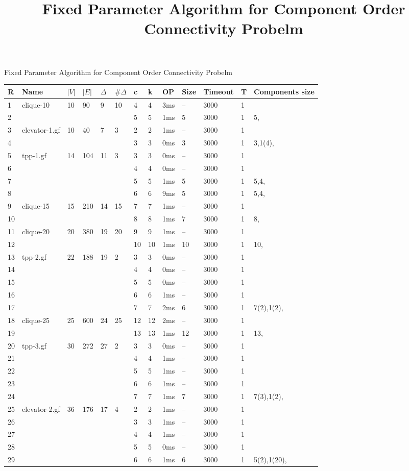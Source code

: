 \documentclass{article}
\title{Fixed Parameter Algorithm for Component Order Connectivity Probelm}
\begin{document}
\maketitle
Fixed Parameter Algorithm for Component Order Connectivity Probelm
\begin{longtable}{|l |l |l |l |l |l |l |l |l |l |l |l |l |}
\hline
R&Name&$|V|$&$|E|$&$\Delta$&$\# \Delta$&c&k&OP&Size&Timeout&T&Components size\\
\hline
1&clique-10&10&90&9&10&4&4&3ms&--&3000&1&\\
2&&&&&&5&5&1ms&5&3000&1&5,\\
3&elevator-1.gf&10&40&7&3&2&2&1ms&--&3000&1&\\
4&&&&&&3&3&0ms&3&3000&1&3,1(4),\\
5&tpp-1.gf&14&104&11&3&3&3&0ms&--&3000&1&\\
6&&&&&&4&4&0ms&--&3000&1&\\
7&&&&&&5&5&1ms&5&3000&1&5,4,\\
8&&&&&&6&6&9ms&5&3000&1&5,4,\\
9&clique-15&15&210&14&15&7&7&1ms&--&3000&1&\\
10&&&&&&8&8&1ms&7&3000&1&8,\\
11&clique-20&20&380&19&20&9&9&1ms&--&3000&1&\\
12&&&&&&10&10&1ms&10&3000&1&10,\\
13&tpp-2.gf&22&188&19&2&3&3&0ms&--&3000&1&\\
14&&&&&&4&4&0ms&--&3000&1&\\
15&&&&&&5&5&0ms&--&3000&1&\\
16&&&&&&6&6&1ms&--&3000&1&\\
17&&&&&&7&7&2ms&6&3000&1&7(2),1(2),\\
18&clique-25&25&600&24&25&12&12&2ms&--&3000&1&\\
19&&&&&&13&13&1ms&12&3000&1&13,\\
20&tpp-3.gf&30&272&27&2&3&3&0ms&--&3000&1&\\
21&&&&&&4&4&1ms&--&3000&1&\\
22&&&&&&5&5&1ms&--&3000&1&\\
23&&&&&&6&6&1ms&--&3000&1&\\
24&&&&&&7&7&1ms&7&3000&1&7(3),1(2),\\
25&elevator-2.gf&36&176&17&4&2&2&1ms&--&3000&1&\\
26&&&&&&3&3&1ms&--&3000&1&\\
27&&&&&&4&4&1ms&--&3000&1&\\
28&&&&&&5&5&0ms&--&3000&1&\\
29&&&&&&6&6&1ms&6&3000&1&5(2),1(20),\\

\end{longtable}
\end{document}
